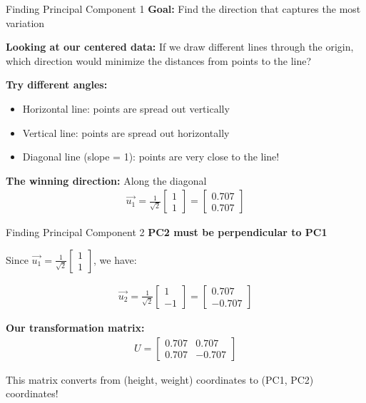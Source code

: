 \documentclass[aspectratio=169]{beamer}
\begin{document}
\begin{frame}{Finding Principal Component 1}
\textbf{Goal:} Find the direction that captures the most variation

\vspace{1em}
\textbf{Looking at our centered data:} If we draw different lines through the origin, which direction would minimize the distances from points to the line?

\vspace{1em}
\textbf{Try different angles:}
\begin{itemize}
    \item Horizontal line: points are spread out vertically
    \item Vertical line: points are spread out horizontally  
    \item Diagonal line (slope = 1): points are very close to the line!
\end{itemize}

\vspace{1em}
\textbf{The winning direction:} Along the diagonal
\begin{align}
\vec{u_1} = \frac{1}{\sqrt{2}}\begin{bmatrix} 1 \\ 1 \end{bmatrix} = \begin{bmatrix} 0.707 \\ 0.707 \end{bmatrix}
\end{align}
\end{frame}

\begin{frame}{Finding Principal Component 2}
\textbf{PC2 must be perpendicular to PC1}

\vspace{1em}
Since $\vec{u_1} = \frac{1}{\sqrt{2}}\begin{bmatrix} 1 \\ 1 \end{bmatrix}$, we have:

\begin{align}
\vec{u_2} = \frac{1}{\sqrt{2}}\begin{bmatrix} 1 \\ -1 \end{bmatrix} = \begin{bmatrix} 0.707 \\ -0.707 \end{bmatrix}
\end{align}

\vspace{1em}
\textbf{Our transformation matrix:}
\begin{align}
U = \begin{bmatrix} 0.707 & 0.707 \\ 0.707 & -0.707 \end{bmatrix}
\end{align}

This matrix converts from (height, weight) coordinates to (PC1, PC2) coordinates!
\end{frame}
\end{document}
